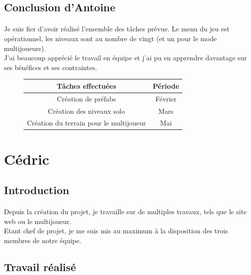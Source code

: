 \documentclass[titlepage, 13px, a4paper]{report}
\begin{document}
\subsection{Conclusion d'Antoine}
\paragraph*{} \hspace{0pt}
Je suis fier d’avoir réalisé l’ensemble des tâches prévue. 
Le menu du jeu est opérationnel, les niveaux
sont au nombre de vingt (et un pour le mode multijoueurs). \\
J'ai beaucoup apprécié le travail en équipe et j'ai pu en 
apprendre davantage sur ses bénéfices et ses contraintes. \\

{\begin{figure}[h!]
	\centering
		\begin{tabular}{|c|c|}
			\hline
			Tâches effectuées & Période \\
			\hline
			Création de préfabs & Février \\
			\hline
			Création des niveaux solo & Mars \\
			\hline
			Création du terrain pour le multijoueur & Mai \\
			\hline
		\end{tabular}
		\label{Les taches d'Antoine}
\end{figure}}


\newpage
\section{Cédric}
\subsection{Introduction}
\paragraph*{} \hspace{0pt}
Depuis la création du projet, je travaille sur de multiples travaux, tels que le site web ou le multijoueur. \\
Etant chef de projet, je me suis mis au maximum à la disposition des trois membres de notre équipe. \\


\subsection{Travail réalisé}
\end{document}
